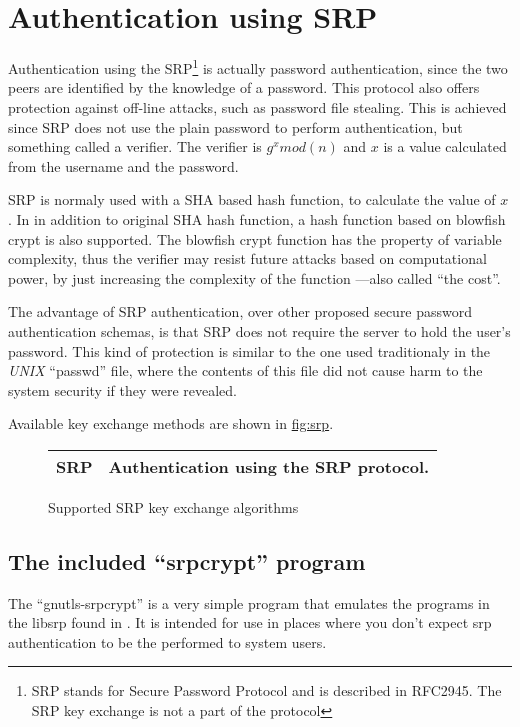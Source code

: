 \section{Authentication using SRP}
Authentication using the SRP\footnote{SRP stands for Secure Password Protocol and 
is described in RFC2945. The SRP key exchange is not a part of the \tlsI{} protocol}
is actually password authentication, since the two peers are identified by the knowledge of a password. 
This protocol also offers protection against off-line attacks, such as password 
file stealing. 
This is achieved since SRP does not use the plain password to perform authentication, but something called a 
verifier. The verifier is $g^{x}mod(n)$ and $x$ is a value calculated
from the username and the password. 
\par SRP is normaly used with a SHA based hash function, to calculate
the value of $x$. In \gnutls{} in addition to original SHA hash function,
a hash function based on blowfish crypt is also supported. The blowfish
crypt function has the property of variable complexity, thus the
verifier may resist future attacks based on computational power, by just increasing
the complexity of the function ---also called ``the cost''.
\par The advantage of SRP authentication, over other proposed secure password 
authentication schemas, is that SRP does not require the server to hold
the user's password. This kind of protection is similar to the one used traditionaly
in the \emph{UNIX} ``passwd'' file, where the contents of this file did not cause
harm to the system security if they were revealed.
\par
Available key exchange methods are shown in \hyperref{figure}{figure }{}{fig:srp}.

\begin{figure}[hbtp]
\begin{tabular}{|l|p{9cm}|}

\hline
SRP & Authentication using the SRP protocol. 
\\
\hline
\end{tabular}

\caption{Supported SRP key exchange algorithms}
\label{fig:srp}

\end{figure}

\subsection{The included ``srpcrypt'' program}
The ``gnutls-srpcrypt'' is a very simple program that emulates the programs in the libsrp 
found in .
It is intended for use in places where you don't expect srp
authentication to be the performed to system users.

